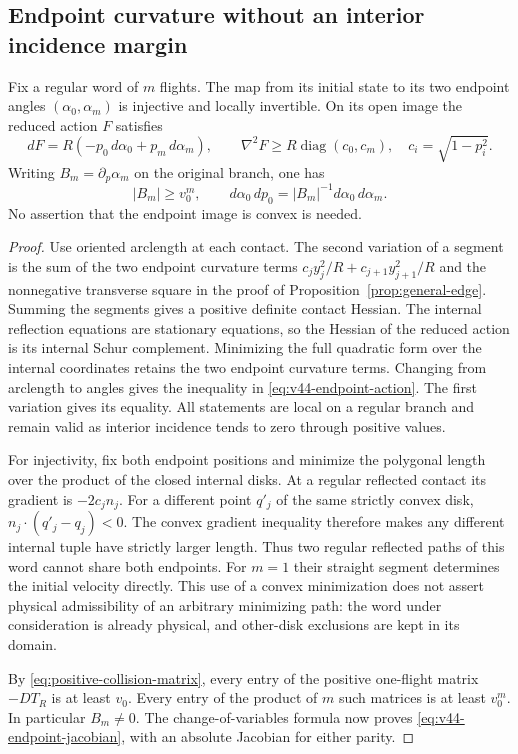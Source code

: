 \subsection{Endpoint curvature without an interior incidence margin}
\begin{lemma}
\label{lem:v44-endpoint-curvature}
Fix a regular word of $m$ flights. The map from its initial state to
its two endpoint angles $(\alpha_0,\alpha_m)$ is injective and locally
invertible. On its open image the reduced action $F$ satisfies
\begin{equation}\label{eq:v44-endpoint-action}
 dF=R(-p_0\,d\alpha_0+p_m\,d\alpha_m),\qquad
 \nabla^2F\ge R\operatorname{diag}(c_0,c_m),
 \quad c_i=\sqrt{1-p_i^2}.
\end{equation}
Writing $B_m=\partial_p\alpha_m$ on the original branch, one has
\begin{equation}\label{eq:v44-endpoint-jacobian}
 |B_m|\ge v_0^m,\qquad
 d\alpha_0\,dp_0=|B_m|^{-1}d\alpha_0\,d\alpha_m.
\end{equation}
No assertion that the endpoint image is convex is needed.
\end{lemma}
\begin{proof}
Use oriented arclength at each contact. The second variation of a
segment is the sum of the two endpoint curvature terms
$c_j y_j^2/R+c_{j+1}y_{j+1}^2/R$ and the nonnegative transverse square
in the proof of Proposition~\ref{prop:general-edge}. Summing the
segments gives a positive definite contact Hessian. The internal
reflection equations are stationary equations, so the Hessian of the
reduced action is its internal Schur complement. Minimizing the full
quadratic form over the internal coordinates retains the two endpoint
curvature terms. Changing from arclength to angles gives the inequality
in \eqref{eq:v44-endpoint-action}. The first variation gives its equality.
All statements are local on a regular branch and remain valid as
interior incidence tends to zero through positive values.

For injectivity, fix both endpoint positions and minimize the polygonal
length over the product of the closed internal disks. At a regular
reflected contact its gradient is $-2c_j n_j$. For a different point
$q'_j$ of the same strictly convex disk,
$n_j\cdot(q'_j-q_j)<0$. The convex gradient inequality therefore makes
any different internal tuple have strictly larger length. Thus two
regular reflected paths of this word cannot share both endpoints.
For $m=1$ their straight segment determines the initial velocity directly.
This use of a convex minimization does not assert physical admissibility
of an arbitrary minimizing path: the word under consideration is already
physical, and other-disk exclusions are kept in its domain.

By \eqref{eq:positive-collision-matrix}, every entry of the positive
one-flight matrix $-DT_R$ is at least $v_0$. Every entry of the product
of $m$ such matrices is at least $v_0^m$. In particular $B_m\ne0$.
The change-of-variables formula now proves
\eqref{eq:v44-endpoint-jacobian}, with an absolute Jacobian for either parity.
\end{proof}

